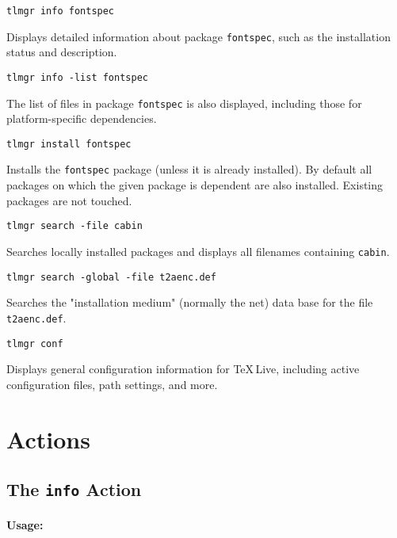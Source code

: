 \documentclass[11pt]{article}
\begin{document}
\begin{description}
\item\texttt{tlmgr info fontspec}\par 

Displays detailed information about package
\texttt{fontspec}, such as the installation status and
description.

\item\texttt{tlmgr info -list fontspec}\par 

The list of files in package \texttt{fontspec} is
also displayed, including those for platform-specific
dependencies.

\item\texttt{tlmgr install fontspec}\par 

Installs the \texttt{fontspec} package (unless it is already
installed). By default all packages on which the given
package is dependent are also installed. Existing packages
are not touched.

\item\texttt{tlmgr search -file cabin}\par 

Searches locally installed packages and displays all filenames
containing \texttt{cabin}.

\item\texttt{tlmgr search -global -file t2aenc.def} 

Searches the "installation medium" (normally the net) data base for the file \texttt{t2aenc.def}.

\item\texttt{tlmgr conf}\par

Displays general configuration information for \TeX\,Live, including active configuration files, path settings, and more. 

\end{description}

\clearpage

\section{Actions}
\label{Actions}

\subsection{The {\tt info} Action}
\label{info}

\paragraph{Usage:}
\end{document}

